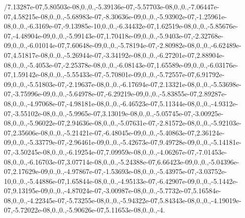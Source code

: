 \begin{DoxyCompactItemize}
/7.\-13287e-\/07,5.\-80503e-\/08,0.,0.,-\/5.\-39136e-\/07,-\/5.\-57703e-\/08,0.,0.,-\/7.\-06447e-\/07,4.\-58215e-\/08,0.,0.,-\/5.\-68983e-\/07,-\/8.\-30636e-\/09,0.,0.,-\/5.\-93902e-\/07,-\/1.\-25961e-\/08,0.,0.,-\/6.\-3169e-\/07,-\/9.\-13985e-\/10,0.,0.,-\/6.\-34432e-\/07,1.\-62519e-\/08,0.,0.,-\/5.\-85676e-\/07,-\/4.\-48904e-\/09,0.,0.,-\/5.\-99143e-\/07,1.\-70418e-\/09,0.,0.,-\/5.\-9403e-\/07,-\/2.\-32768e-\/09,0.,0.,-\/6.\-01014e-\/07,7.\-60648e-\/09,0.,0.,-\/5.\-78194e-\/07,-\/2.\-80982e-\/08,0.,0.,-\/6.\-62489e-\/07,4.\-51817e-\/08,0.,0.,-\/5.\-26944e-\/07,-\/3.\-34192e-\/08,0.,0.,-\/6.\-27201e-\/07,2.\-88904e-\/08,0.,0.,-\/5.\-4053e-\/07,-\/2.\-25378e-\/08,0.,0.,-\/6.\-08143e-\/07,1.\-65589e-\/09,0.,0.,-\/6.\-03176e-\/07,1.\-59142e-\/08,0.,0.,-\/5.\-55433e-\/07,-\/5.\-70801e-\/09,0.,0.,-\/5.\-72557e-\/07,6.\-91792e-\/09,0.,0.,-\/5.\-51803e-\/07,-\/2.\-19637e-\/08,0.,0.,-\/6.\-17694e-\/07,2.\-13321e-\/08,0.,0.,-\/5.\-53698e-\/07,-\/3.\-75996e-\/09,0.,0.,-\/5.\-64978e-\/07,-\/6.\-29219e-\/09,0.,0.,-\/5.\-83855e-\/07,2.\-89287e-\/08,0.,0.,-\/4.\-97068e-\/07,-\/4.\-98181e-\/08,0.,0.,-\/6.\-46523e-\/07,5.\-11344e-\/08,0.,0.,-\/4.\-9312e-\/07,-\/3.\-55102e-\/08,0.,0.,-\/5.\-9965e-\/07,3.\-13019e-\/08,0.,0.,-\/5.\-05745e-\/07,-\/3.\-00925e-\/08,0.,0.,-\/5.\-96022e-\/07,2.\-94636e-\/08,0.,0.,-\/5.\-07631e-\/07,-\/2.\-81572e-\/08,0.,0.,-\/5.\-92103e-\/07,2.\-35606e-\/08,0.,0.,-\/5.\-21421e-\/07,-\/6.\-48045e-\/09,0.,0.,-\/5.\-40863e-\/07,2.\-36124e-\/09,0.,0.,-\/5.\-33779e-\/07,-\/2.\-96461e-\/09,0.,0.,-\/5.\-42673e-\/07,9.\-49728e-\/09,0.,0.,-\/5.\-14181e-\/07,-\/3.\-50245e-\/08,0.,0.,-\/6.\-19254e-\/07,7.\-09959e-\/08,0.,0.,-\/4.\-06267e-\/07,-\/7.\-01453e-\/08,0.,0.,-\/6.\-16703e-\/07,3.\-07714e-\/08,0.,0.,-\/5.\-24388e-\/07,6.\-66423e-\/09,0.,0.,-\/5.\-04396e-\/07,2.\-17629e-\/09,0.,0.,-\/4.\-97867e-\/07,-\/1.\-53693e-\/08,0.,0.,-\/5.\-43975e-\/07,-\/3.\-03752e-\/10,0.,0.,-\/5.\-44886e-\/07,1.\-65844e-\/08,0.,0.,-\/4.\-95133e-\/07,-\/6.\-42907e-\/09,0.,0.,-\/5.\-1442e-\/07,9.\-13195e-\/09,0.,0.,-\/4.\-87024e-\/07,-\/3.\-00987e-\/08,0.,0.,-\/5.\-7732e-\/07,5.\-16584e-\/08,0.,0.,-\/4.\-22345e-\/07,-\/5.\-73255e-\/08,0.,0.,-\/5.\-94322e-\/07,5.\-84343e-\/08,0.,0.,-\/4.\-19019e-\/07,-\/5.\-72022e-\/08,0.,0.,-\/5.\-90626e-\/07,5.\-11653e-\/08,0.,0.,-\/4.
\end{DoxyCompactItemize}

